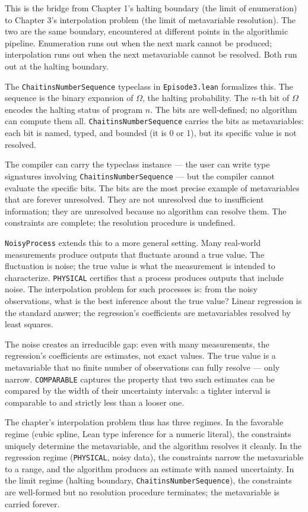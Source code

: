 This is the bridge from Chapter 1's halting boundary (the limit of
enumeration) to Chapter 3's interpolation problem (the limit of
metavariable resolution). The two are the same boundary, encountered at
different points in the algorithmic pipeline. Enumeration runs out
when the next mark cannot be produced; interpolation runs out when the
next metavariable cannot be resolved. Both run out at the halting
boundary.

The \texttt{ChaitinsNumberSequence} typeclass in \texttt{Episode3.lean}
formalizes this. The sequence is the binary expansion of $\Omega$, the
halting probability. The $n$-th bit of $\Omega$ encodes the halting
status of program $n$. The bits are well-defined; no algorithm can
compute them all. \texttt{ChaitinsNumberSequence} carries the bits as
metavariables: each bit is named, typed, and bounded (it is 0 or 1),
but its specific value is not resolved.

The compiler can carry the typeclass instance --- the user can write
type signatures involving \texttt{ChaitinsNumberSequence} --- but the
compiler cannot evaluate the specific bits. The bits are the most
precise example of metavariables that are forever unresolved. They
are not unresolved due to insufficient information; they are
unresolved because no algorithm can resolve them. The constraints are
complete; the resolution procedure is undefined.

\texttt{NoisyProcess} extends this to a more general setting. Many
real-world measurements produce outputs that fluctuate around a true
value. The fluctuation is noise; the true value is what the
measurement is intended to characterize. \texttt{PHYSICAL} certifies
that a process produces outputs that include noise. The interpolation
problem for such processes is: from the noisy observations, what is
the best inference about the true value? Linear regression is the
standard answer; the regression's coefficients are metavariables
resolved by least squares.

The noise creates an irreducible gap: even with many measurements,
the regression's coefficients are estimates, not exact values. The
true value is a metavariable that no finite number of observations
can fully resolve --- only narrow. \texttt{COMPARABLE} captures the
property that two such estimates can be compared by the width of
their uncertainty intervals: a tighter interval is comparable to and
strictly less than a looser one.

The chapter's interpolation problem thus has three regimes. In the
favorable regime (cubic spline, Lean type inference for a numeric
literal), the constraints uniquely determine the metavariable, and
the algorithm resolves it cleanly. In the regression regime
(\texttt{PHYSICAL}, noisy data), the constraints narrow the
metavariable to a range, and the algorithm produces an estimate with
named uncertainty. In the limit regime (halting boundary,
\texttt{ChaitinsNumberSequence}), the constraints are well-formed but
no resolution procedure terminates; the metavariable is carried
forever.

